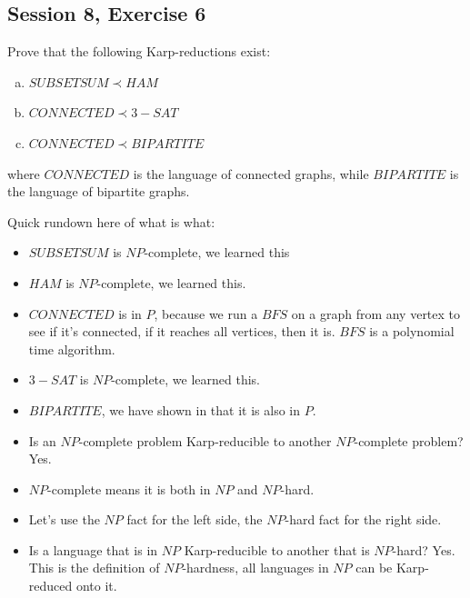 \subsection {Session 8, Exercise 6}
\label{8_6}


Prove that the following Karp-reductions exist:

\begin{enumerate}[a)]
    \item $SUBSETSUM \prec HAM$
    \item $CONNECTED \prec 3-SAT$
    \item $CONNECTED \prec BIPARTITE$
\end{enumerate}

where $CONNECTED$ is the language of connected graphs, while $BIPARTITE$ is the language of bipartite graphs.


Quick rundown here of what is what:

\begin{itemize}
    \item $SUBSETSUM$ is $NP$-complete, we learned this
    \item $HAM$ is $NP$-complete, we learned this.
    \item $CONNECTED$ is in $P$, because we run a $BFS$ on a graph from any vertex to see if it's connected, if it reaches all vertices, then it is. $BFS$ is a polynomial time algorithm.
    \item $3-SAT$ is $NP$-complete, we learned this.
    \item $BIPARTITE$, we have shown in  that it is also in $P$.
\end{itemize}


\begin{itemize}
    \item Is an $NP$-complete problem Karp-reducible to another $NP$-complete problem? Yes.
    \item $NP$-complete means it is both in $NP$ and $NP$-hard.
    \item Let's use the $NP$ fact for the left side, the $NP$-hard fact for the right side.
    \item Is a language that is in $NP$ Karp-reducible to another that is $NP$-hard? Yes. This is the definition of $NP$-hardness, all languages in $NP$ can be Karp-reduced onto it.
\end{itemize}

